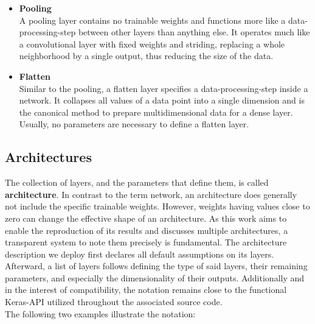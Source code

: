 \begin{itemize}
	\item \textbf{Pooling}\\
	A pooling layer contains no trainable weights and functions more like a data-processing-step between other layers than anything else. It operates much like a convolutional layer with fixed weights and striding,  replacing a whole neighborhood by a single output, thus reducing the size of the data.\\
	\item \textbf{Flatten}\\  
	Similar to the pooling, a flatten layer specifies a data-processing-step inside a network. It collapses all values of a data point into a single dimension and is the canonical method to prepare multidimensional data for a dense layer. Usually, no parameters are necessary to define a flatten layer.\\
\end{itemize}

\subsection{Architectures}
The collection of layers, and the parameters that define them, is called \textbf{architecture}. In contrast to the term network, an architecture does generally not include the specific trainable weights. However, weights having values close to zero can change the effective shape of an architecture.
As this work aims to enable the reproduction of its results and discusses multiple architectures, a transparent system to note them precisely is fundamental. The architecture description we deploy first declares all default assumptions on its layers. Afterward, a list of layers follows defining the type of said layers, their remaining parameters, and especially the dimensionality of their outputs. Additionally and in the interest of compatibility, the notation remains close to the functional Keras-API utilized throughout the associated source code.\\
The following two examples illustrate the notation:

